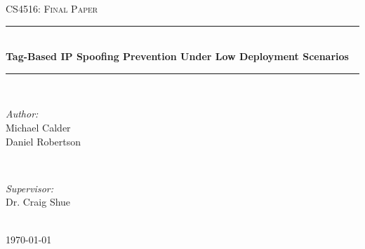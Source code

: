 \documentclass[12pt]{article} %
\begin{document}

\begin{titlepage}

\newcommand{\HRule}{\rule{\linewidth}{0.5mm}} %

\center %

\textsc{\LARGE CS4516: Final Paper}\\[1.5cm] %

\HRule \\[0.4cm]
{ \huge \bfseries Tag-Based IP Spoofing Prevention Under Low Deployment Scenarios}\\[0.4cm] %
\HRule \\[1.5cm]

\begin{minipage}{0.4\textwidth}
\begin{flushleft} \large
\emph{Author:}\\
Michael Calder\\
Daniel Robertson\\
\end{flushleft}
\end{minipage}
~
\begin{minipage}{0.4\textwidth}
\begin{flushright} \large
\emph{Supervisor:} \\
Dr. Craig Shue %
\end{flushright}
\end{minipage}\\[4cm]

{\large \today}\\[3cm] %


\vfill %

\end{titlepage}

\end{document}
